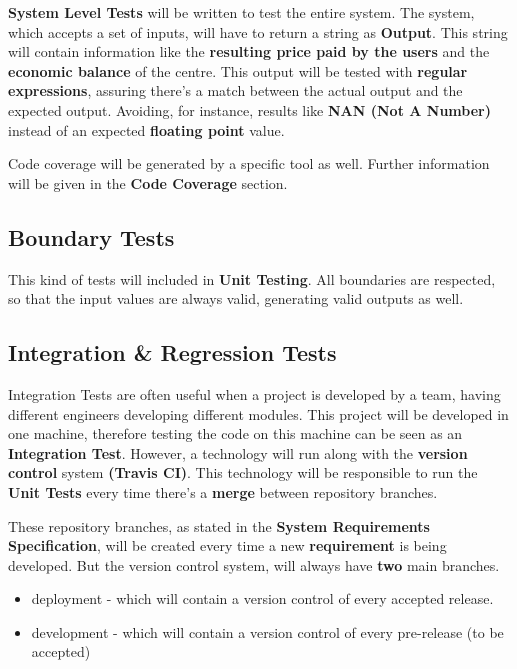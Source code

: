 \documentclass[12pt]{article}
\begin{document}
\textbf{System Level Tests} will be written to test the entire system. The system, which accepts a set of inputs, will have to return a string as \textbf{Output}. This string will contain information like the \textbf{resulting price paid by the users} and the \textbf{economic balance} of the centre. This output will be tested with \textbf{regular expressions}, assuring there's a match between the actual output and the expected output. Avoiding, for instance, results like \textbf{NAN (Not A Number)} instead of an expected \textbf{floating point} value.

Code coverage will be generated by a specific tool as well. Further information will be given in the \textbf{Code Coverage} section.

\subsection*{Boundary Tests}

This kind of tests will included in \textbf{Unit Testing}. All boundaries are respected, so that the input values are always valid, generating valid outputs as well. 

\subsection*{Integration \& Regression Tests}

Integration Tests are often useful when a project is developed by a team, having different engineers developing different modules. This project will be developed in one machine, therefore testing the code on this machine can be seen as an \textbf{Integration Test}. However, a technology will run along with the \textbf{version control} system \textbf{(Travis CI)}. This technology will be responsible to run the \textbf{Unit Tests} every time there's a \textbf{merge} between repository branches. 

These repository branches, as stated in the \textbf{System Requirements Specification}, will be created every time a new \textbf{requirement} is being developed. But the version control system, will always have \textbf{two} main branches.

\begin{itemize}  
\item deployment - which will contain a version control of every accepted release. 
\item development - which will contain a version control of every pre-release (to be accepted)
\end{itemize}
\end{document}
